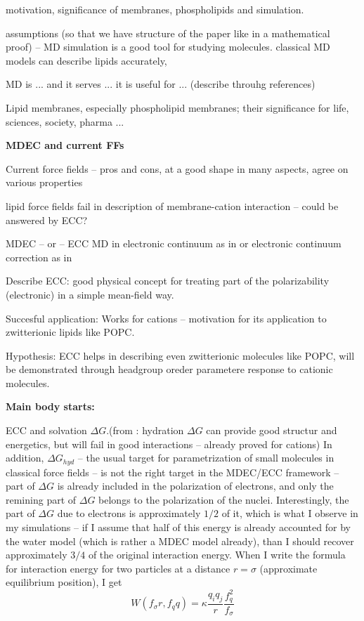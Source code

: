 \documentclass[aip,jcp]{revtex4}
\begin{document}
 motivation, significance of membranes, phospholipids and simulation.

 assumptions (so that we have structure of the paper like in a mathematical proof) -- 
 MD simulation is a good tool for studying molecules.
 classical MD models can describe lipids accurately, 

 MD is ... and it serves ... it is useful for ... (describe throuhg references)

 Lipid membranes, especially phospholipid membranes; their significance for life, sciences, society, pharma ...

\textbf{MDEC and current FFs}

 Current force fields -- pros and cons, at a good shape in many aspects, agree on various properties

 lipid force fields fail in description of membrane-cation interaction -- could be answered by ECC?

MDEC -- or -- ECC 
MD in electronic continuum as in \cite{Leontyev2015} or electronic continuum correction as in \cite{Jungwirth2015}

Describe ECC: good physical concept for treating part of the polarizability (electronic) in a simple mean-field way.

Succesful application: Works for cations \cite{Jungwirth2015,Kohagen..} -- motivation for its application to zwitterionic lipids like POPC.

Hypothesis: ECC helps in describing even zwitterionic molecules like POPC, will be demonstrated through headgroup oreder parametere response to cationic molecules.

\textbf{Main body starts:}

ECC and solvation $\Delta G$.(from \cite{Leontyev2015}: hydration $\Delta G$ can provide good structur and energetics, but will fail in good interactions -- already proved for cations)
In addition, $\Delta G_{hyd}$ -- the usual target for parametrization of small molecules in classical force fields -- is not the right target in the MDEC/ECC framework -- part of $\Delta G$ is already included in the polarization of electrons, and only the remining part of $\Delta G$ belongs to the polarization of the nuclei. 
Interestingly, the part of $\Delta G$ due to electrons is approximately $1/2$ of it, which is what I observe in my simulations -- if I assume that half of this energy is already accounted for by the water model (which is rather a MDEC model already), than I should recover approximately $3/4$ of the original interaction energy. 
When I write the formula for interaction energy for two particles at a distance $r=\sigma$ (approximate equilibrium position), I get
\begin{equation}
W(f_\sigma r,f_q q) = \kappa \frac{q_i q_j}{r} \frac{f_q^2}{f_\sigma}
\end{equation}
\end{document}
